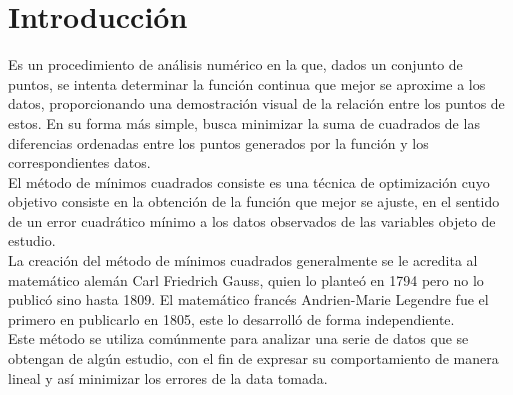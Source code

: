 \documentclass[12pt]{article}
\begin{document}
		\section*{\centering Introducción}\label{sec:Introducción}
			Es un procedimiento de análisis numérico en la que, dados un conjunto de puntos, se intenta 
			determinar la función continua que mejor se aproxime a los datos, proporcionando una demostración 
			visual de la relación entre los puntos de estos. En su forma más simple, busca minimizar la 
			suma de cuadrados de las diferencias ordenadas entre los puntos generados por la función y los 
			correspondientes datos. \cite{bib:item1}\\
			El método de mínimos cuadrados consiste es una técnica de optimización cuyo objetivo consiste 
			en la obtención de la función que mejor se ajuste, en el sentido de un error cuadrático mínimo 
			a los datos observados de las variables objeto de estudio. \cite{bib:item2}\\
			La creación del método de mínimos cuadrados generalmente se le acredita al matemático alemán Carl 
			Friedrich Gauss, quien lo planteó en 1794 pero no lo publicó sino hasta 1809. El matemático francés 
			Andrien-Marie Legendre fue el primero en publicarlo en 1805, este lo desarrolló de forma independiente.\\
			Este método se utiliza comúnmente para analizar una serie de datos que se obtengan de algún estudio, 
			con el fin de expresar su comportamiento de manera lineal y así minimizar los errores de la data 
			tomada. \cite{bib:item1}
		
\end{document}
